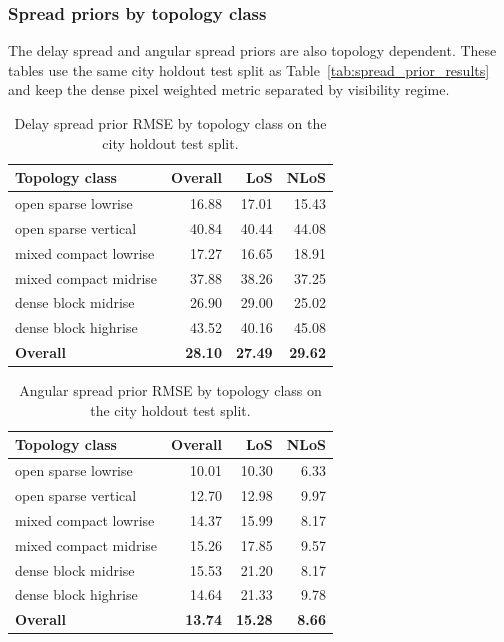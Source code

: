 \subsubsection{Spread priors by topology class}

The delay spread and angular spread priors are also topology dependent. These
tables use the same city holdout test split as Table~\ref{tab:spread_prior_results}
and keep the dense pixel weighted metric separated by visibility regime.

\begin{table}[!htbp]
\centering
\caption{Delay spread prior RMSE by topology class on the city holdout test split.}
\label{tab:ds_topo}
\small
\begin{tabularx}{\textwidth}{>{\raggedright\arraybackslash}Xrrr}
\toprule
Topology class & Overall & LoS & NLoS \\
\midrule
open sparse lowrise   & 16.88 & 17.01 & 15.43 \\
open sparse vertical  & 40.84 & 40.44 & 44.08 \\
mixed compact lowrise & 17.27 & 16.65 & 18.91 \\
mixed compact midrise & 37.88 & 38.26 & 37.25 \\
dense block midrise   & 26.90 & 29.00 & 25.02 \\
dense block highrise  & 43.52 & 40.16 & 45.08 \\
\midrule
\textbf{Overall}      & \textbf{28.10} & \textbf{27.49} & \textbf{29.62} \\
\bottomrule
\end{tabularx}
\end{table}

\begin{table}[!htbp]
\centering
\caption{Angular spread prior RMSE by topology class on the city holdout test split.}
\label{tab:as_topo}
\small
\begin{tabularx}{\textwidth}{>{\raggedright\arraybackslash}Xrrr}
\toprule
Topology class & Overall & LoS & NLoS \\
\midrule
open sparse lowrise   & 10.01 & 10.30 & 6.33 \\
open sparse vertical  & 12.70 & 12.98 & 9.97 \\
mixed compact lowrise & 14.37 & 15.99 & 8.17 \\
mixed compact midrise & 15.26 & 17.85 & 9.57 \\
dense block midrise   & 15.53 & 21.20 & 8.17 \\
dense block highrise  & 14.64 & 21.33 & 9.78 \\
\midrule
\textbf{Overall}      & \textbf{13.74} & \textbf{15.28} & \textbf{8.66} \\
\bottomrule
\end{tabularx}
\end{table}

